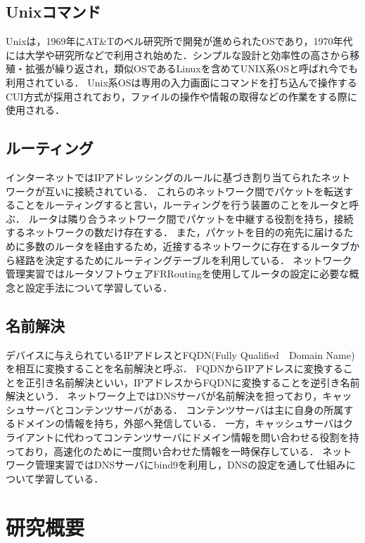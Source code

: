 \documentclass[12pt,a4j,titlepage]{ltjsarticle}
\begin{document}
\subsection{Unixコマンド}
Unixは，1969年にAT\&Tのベル研究所で開発が進められたOSであり，1970年代には大学や研究所などで利用され始めた．シンプルな設計と効率性の高さから移殖・拡張が繰り返され，類似OSであるLinuxを含めてUNIX系OSと呼ばれ今でも利用されている．
Unix系OSは専用の入力画面にコマンドを打ち込んで操作するCUI方式が採用されており，ファイルの操作や情報の取得などの作業をする際に使用される．

\clearpage

\subsection{ルーティング}
インターネットではIPアドレッシングのルールに基づき割り当てられたネットワークが互いに接続されている．
これらのネットワーク間でパケットを転送することをルーティングすると言い，ルーティングを行う装置のことをルータと呼ぶ．
ルータは隣り合うネットワーク間でパケットを中継する役割を持ち，接続するネットワークの数だけ存在する．
また，パケットを目的の宛先に届けるために多数のルータを経由するため，近接するネットワークに存在するルータブから経路を決定するためにルーティングテーブルを利用している．
ネットワーク管理実習ではルータソフトウェアFRRoutingを使用してルータの設定に必要な概念と設定手法について学習している．


\subsection{名前解決}
デバイスに与えられているIPアドレスとFQDN(Fully Qualified　Domain Name)を相互に変換することを名前解決と呼ぶ．
FQDNからIPアドレスに変換することを正引き名前解決といい，IPアドレスからFQDNに変換することを逆引き名前解決という．
ネットワーク上ではDNSサーバが名前解決を担っており，キャッシュサーバとコンテンツサーバがある．
コンテンツサーバは主に自身の所属するドメインの情報を持ち，外部へ発信している．
一方，キャッシュサーバはクライアントに代わってコンテンツサーバにドメイン情報を問い合わせる役割を持っており，高速化のために一度問い合わせた情報を一時保存している．
ネットワーク管理実習ではDNSサーバにbind9を利用し，DNSの設定を通して仕組みについて学習している．

\clearpage

\section{研究概要}
\end{document}
